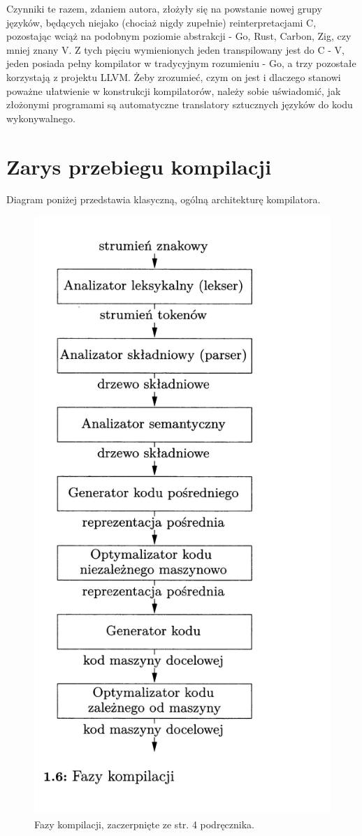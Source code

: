 Czynniki te razem, zdaniem autora, złożyły się na powstanie nowej grupy języków, będących niejako (chociaż nigdy zupełnie) reinterpretacjami C, pozostając wciąż na podobnym poziomie abstrakcji - Go, Rust, Carbon, Zig, czy mniej znany V.
Z tych pięciu wymienionych jeden transpilowany jest do C - V\cite{vlang_repo}, jeden posiada pełny kompilator w tradycyjnym rozumieniu - Go\cite{go_faq}, a trzy pozostałe korzystają z projektu LLVM\cite{rust_repo,carbon_repo,zig_repo}. Żeby zrozumieć, czym on jest i dlaczego stanowi poważne ułatwienie w konstrukcji kompilatorów, należy sobie uświadomić, jak złożonymi programami są automatyczne translatory sztucznych języków do kodu wykonywalnego. 
\clearpage

\section{Zarys przebiegu kompilacji}
Diagram poniżej przedstawia klasyczną, ogólną architekturę kompilatora.

\begin{figure}[H]
    \centering
    \includegraphics[height=0.8\linewidth]{images/wstep/fazy_kompilacji.png_bin_popr.png}
    \caption{Fazy kompilacji, zaczerpnięte ze str. 4 podręcznika\cite{DRAGON_BOOK}.}
\end{figure}

 
